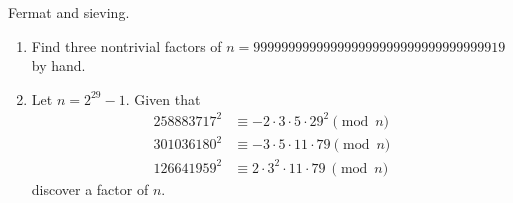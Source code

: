 \begin{problem}
  Fermat and sieving.
  \begin{enumerate}\renewcommand{\itemsep}{3mm}
    \item Find three nontrivial factors of
    $n=999999999999999999999999999999999919$ by hand.
    
    \item Let $n=2^{29}-1$.  Given that
    \begin{align*} 
      258883717^2 &\equiv -2\cdot 3 \cdot 5 \cdot 29^2  {} \pmod n \\
      301036180^2 &\equiv -3\cdot 5 \cdot 11 \cdot 79   {} \pmod{n} \\
      126641959^2 &\equiv 2 \cdot 3^2 \cdot 11 \cdot 79 {~} \pmod n
    \end{align*}
    discover a factor of $n$.
  \end{enumerate}
\end{problem}
